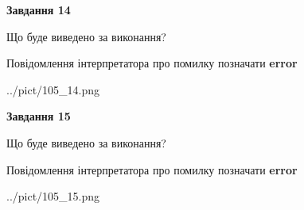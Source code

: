 \documentclass[11pt, ukrainian]{article}
\begin{document}
{\begin {large}
{\begin {center}\textbf{Завдання 14}\end {center}}\par
Що буде виведено за виконання? \par
Повідомлення інтерпретатора про помилку позначати \textbf{error}

\begin{center}
	{../pict/105_14.png}
\end{center}
\newpage

{\begin {center}\textbf{Завдання 15}\end {center}}\par
Що буде виведено за виконання? \par
Повідомлення інтерпретатора про помилку позначати \textbf{error}

\begin{center}
	{../pict/105_15.png}
\end{center}
\newpage

\end {large}}
\end{document}
